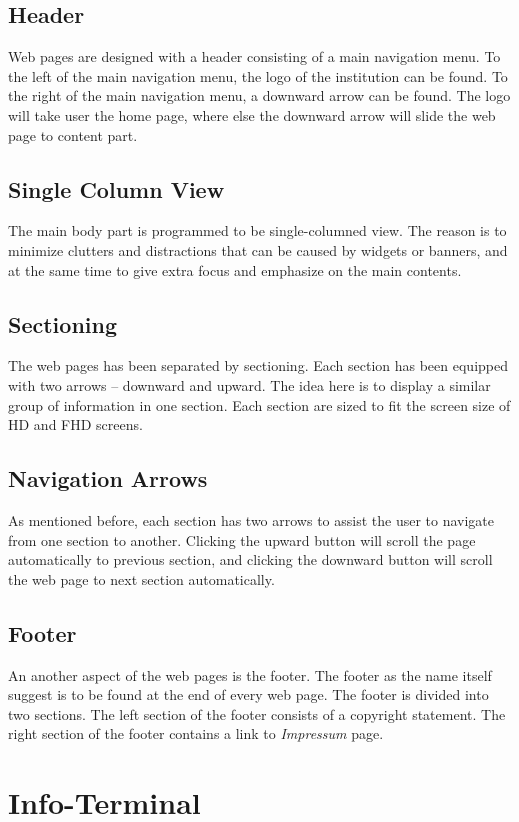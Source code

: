 \subsection*{Header}
Web pages are designed with a header consisting of a main navigation menu. To the left of the main navigation menu, the logo of the institution can be found. To the right of the main navigation menu, a downward arrow can be found. The logo will take user the home page, where else the downward arrow will slide the web page to content part.

\subsection*{Single Column View}
The main body part is programmed to be single-columned view. The reason is to minimize clutters and distractions that can be caused by widgets or banners, and at the same time to give extra focus and emphasize on the main contents.

\subsection*{Sectioning}
The web pages has been separated by sectioning. Each section has been equipped with two arrows -- downward and upward. The idea here is to display a similar group of information in one section. Each section are sized to fit the screen size of HD and FHD screens.

\subsection*{Navigation Arrows}
As mentioned before, each section has two arrows to assist the user to navigate from one section to another. Clicking the upward button will scroll the page automatically to previous section, and clicking the downward button will scroll the web page to next section automatically.

\subsection*{Footer}
An another aspect of the web pages is the footer. The footer as the name itself suggest is to be found at the end of every web page. The footer is divided into two sections. The left section of the footer consists of a copyright statement. The right section of the footer contains a link to \emph{Impressum} page.

\section{Info-Terminal}
